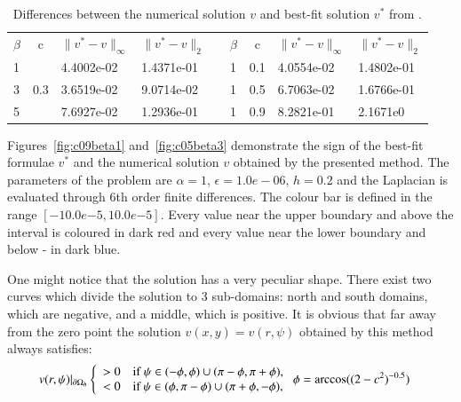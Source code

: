 \documentclass[preprint]{elsarticle}
\newcommand{\dO}{\partial\Omega_{h}}
\begin{document}
\begin{center}
\begin{table}[ht]
\centering
\resizebox{12cm}{!} {
		\begin{tabular}{|l|c|l l| c|l|c|l l|}
			\cline{1-4}\cline{6-9}
$\beta$&c&$\|v^*-v \|_{\infty }$&$\|v^*-v \|_{2 }$& &$\beta$& c&$\|v^*-v \|_{\infty }$&$\|v^*-v \|_{2 }$\\
			\cline{1-4}\cline{6-9}
1&     &4.4002e-02 & 1.4371e-01 & &    1& 0.1& 4.0554e-02  &1.4802e-01\\
3& 0.3 &3.6519e-02 & 9.0714e-02& &    1& 0.5& 6.7063e-02  &1.6766e-01\\
5&     &7.6927e-02 & 1.2936e-01 & &    1& 0.9&  8.2821e-01 &2.1671e0\\
			\cline{1-4}\cline{6-9}
\end{tabular}
}
		\caption{Differences between the numerical solution $v$ and best-fit solution $v^*$ from \cite{Ch2011}.}
\label{tab:first-der-t}
\end{table}
\end{center}

Figures~\ref{fig:c09beta1} and~\ref{fig:c05beta3} demonstrate  the sign of the  best-fit formulae $v^*$ and the  numerical solution $v$ obtained by the presented method.  The parameters of the problem are $\alpha = 1$, $\epsilon = 1.0e-06$, $h = 0.2$ and the  Laplacian is evaluated through 6th order finite differences. The colour bar is defined in the range $[-10.0e{-5},10.0e{-5}]$. Every value near the upper boundary and above  the interval is coloured in dark red and every value near the lower boundary and below - in dark blue.

One might notice that the solution has a very peculiar shape. There exist two curves which divide
the solution to 3 sub-domains: north and south domains, which are negative, and a middle, which is positive.
It is obvious that far away from the zero point the  solution $v(x,y)=v(r,\psi)$ obtained by this method always satisfies:
\begin{equation*}
\begin{split}
   & v(r,\psi)|_{\dO}
	 \left\{
	  \begin{array}{l l}
	    > 0 &  {\text{if}}\; \psi \in (-\phi , \phi  ) \cup (\pi-\phi ,\pi+ \phi ), \\ 
	    < 0 &  \text{if $\psi \in (\phi, \pi-\phi) \cup (\pi+\phi , -\phi ) $},  
	  \end{array} \right. \phi = \arccos( (2-c^2)^{-0.5})
\end{split}
\end{equation*}
\end{document}
